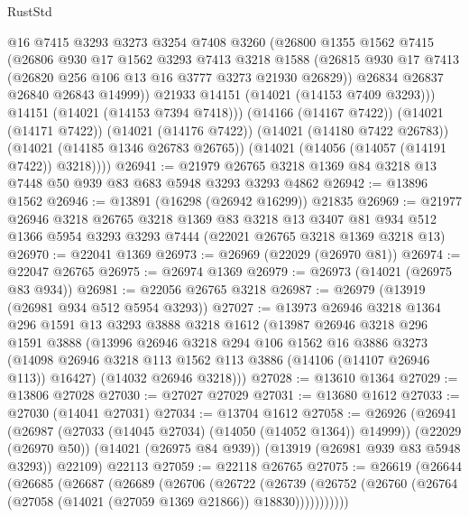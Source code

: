 \begin{lexlean}{RustStd}
\begin{coremodule}
            @16
            @7415
            @3293
            @3273
            @3254
            @7408
            @3260
            (@26800
              @1355
              @1562
              @7415
              (@26806
                @930
                @17
                @1562
                @3293
                @7413
                @3218
                @1588
                (@26815 @930 @17 @7413 (@26820 @256 @106 @13 @16 @3777 @3273 @21930 @26829))
                @26834
                @26837
                @26840
                @26843
                @14999))
            @21933
            @14151
            (@14021 (@14153 @7409 @3293)))
          @14151
          (@14021 (@14153 @7394 @7418)))
        (@14166 (@14167 @7422))
        (@14021 (@14171 @7422))
        (@14021 (@14176 @7422))
        (@14021 (@14180 @7422 @26783))
        (@14021 (@14185 @1346 @26783 @26765))
        (@14021 (@14056 (@14057 (@14191 @7422)) @3218))))
@26941 := @21979 @26765 @3218 @1369 @84 @3218 @13 @7448 @50 @939 @83 @683 @5948 @3293 @3293 @4862
@26942 := @13896 @1562
@26946 := @13891 (@16298 (@26942 @16299)) @21835
@26969 := @21977
    @26946
    @3218
    @26765
    @3218
    @1369
    @83
    @3218
    @13
    @3407
    @81
    @934
    @512
    @1366
    @5954
    @3293
    @3293
    @7444
    (@22021 @26765 @3218 @1369 @3218 @13)
@26970 := @22041 @1369
@26973 := @26969 (@22029 (@26970 @81))
@26974 := @22047 @26765
@26975 := @26974 @1369
@26979 := @26973 (@14021 (@26975 @83 @934))
@26981 := @22056 @26765 @3218
@26987 := @26979 (@13919 (@26981 @934 @512 @5954 @3293))
@27027 := @13973
    @26946
    @3218
    @1364
    @296
    @1591
    @13
    @3293
    @3888
    @3218
    @1612
    (@13987
      @26946
      @3218
      @296
      @1591
      @3888
      (@13996
        @26946
        @3218
        @294
        @106
        @1562
        @16
        @3886
        @3273
        (@14098 @26946 @3218 @113 @1562 @113 @3886 (@14106 (@14107 @26946 @113)) @16427)
        (@14032 @26946 @3218)))
@27028 := @13610 @1364
@27029 := @13806 @27028
@27030 := @27027 @27029
@27031 := @13680 @1612
@27033 := @27030 (@14041 @27031)
@27034 := @13704 @1612
@27058 := @26926
    (@26941
      (@26987 (@27033 (@14045 @27034) (@14050 (@14052 @1364)) @14999))
      (@22029 (@26970 @50))
      (@14021 (@26975 @84 @939))
      (@13919 (@26981 @939 @83 @5948 @3293))
      @22109)
    @22113
@27059 := @22118 @26765
@27075 := @26619
    (@26644
      (@26685
        (@26687
          (@26689
            (@26706
              (@26722
                (@26739
                  (@26752 (@26760 (@26764 (@27058 (@14021 (@27059 @1369 @21866)) @18830)))))))))))

\end{coremodule}
\end{lexlean}

